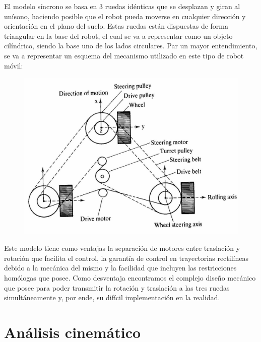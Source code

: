 \documentclass[a4paper,twoside]{article}
\begin{document}
El modelo síncrono se basa en 3 ruedas idénticas que se desplazan y giran al unísono, haciendo posible que el robot pueda moverse en cualquier dirección y orientación en el plano del suelo. Estas ruedas están dispuestas de forma triangular en la base del robot, el cual se va a representar como un objeto cilíndrico, siendo la base uno de los lados circulares. Par un mayor entendimiento, se va a representar un esquema del mecanismo utilizado en este tipo de robot móvil:\\

\begin{figure}[h!]
	\centering
	\includegraphics[width=.6\textwidth]{mecanismo_interno}
\end{figure}

Este modelo tiene como ventajas la separación de motores entre traslación y rotación que facilita el control, la garantía de control en trayectorias rectilíneas debido a la mecánica del mismo y la facilidad que incluyen las restricciones homólogas que posee. Como desventaja encontramos el complejo diseño mecánico que posee para poder transmitir la rotación y traslación a las tres ruedas simultáneamente y, por ende, su difícil implementación en la realidad.\\
\newpage
\section{Análisis cinemático}
\end{document}
